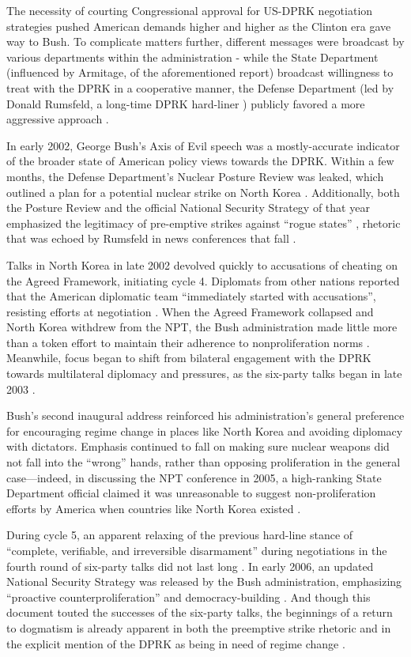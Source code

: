 The necessity of courting Congressional approval for US-DPRK negotiation strategies pushed American demands higher and higher as the Clinton era gave way to Bush. To complicate matters further, different messages were broadcast by various departments within the administration - while the State Department (influenced by Armitage, of the aforementioned report) broadcast willingness to treat with the DPRK in a cooperative manner, the Defense Department (led by Donald Rumsfeld, a long-time DPRK hard-liner \cite{rumsfeld}) publicly favored a more aggressive approach \cite{harnisch}.

In early 2002, George Bush's Axis of Evil speech was a mostly-accurate indicator of the broader state of American policy views towards the DPRK. Within a few months, the Defense Department's Nuclear Posture Review was leaked, which outlined a plan for a potential nuclear strike on North Korea \cite{npreview}. Additionally, both the Posture Review and the official National Security Strategy of that year emphasized the legitimacy of pre-emptive strikes against ``rogue states'' \cite{bleiker}, rhetoric that was echoed by Rumsfeld in news conferences that fall \cite{harnisch}.

Talks in North Korea in late 2002 devolved quickly to accusations of cheating on the Agreed Framework, initiating cycle 4. Diplomats from other nations reported that the American diplomatic team ``immediately started with accusations'', resisting efforts at negotiation \cite{bleiker}. When the Agreed Framework collapsed and North Korea withdrew from the NPT, the Bush administration made little more than a token effort to maintain their adherence to nonproliferation norms \cite{huntley}. Meanwhile, focus began to shift from bilateral engagement with the DPRK towards multilateral diplomacy and pressures, as the six-party talks began in late 2003 \cite{crs13}.

Bush's second inaugural address reinforced his administration's general preference for encouraging regime change in places like North Korea and avoiding diplomacy with dictators. Emphasis continued to fall on making sure nuclear weapons did not fall into the ``wrong'' hands, rather than opposing proliferation in the general case---indeed, in discussing the NPT conference in 2005, a high-ranking State Department official claimed it was unreasonable to suggest non-proliferation efforts by America when countries like North Korea existed \cite{huntley}.

During cycle 5, an apparent relaxing of the previous hard-line stance of ``complete, verifiable, and irreversible disarmament'' during negotiations in the fourth round of six-party talks did not last long \cite{huntley}. In early 2006, an updated National Security Strategy was released by the Bush administration, emphasizing ``proactive counterproliferation'' and democracy-building \cite{nss06}. And though this document touted the successes of the six-party talks, the beginnings of a return to dogmatism is already apparent in both the preemptive strike rhetoric and in the explicit mention of the DPRK as being in need of regime change \cite{nss06}.


